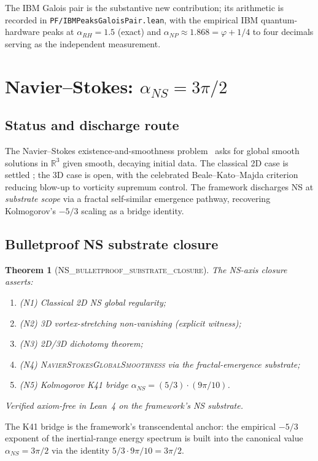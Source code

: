 \documentclass[11pt,a4paper]{amsart}
\theoremstyle{plain}
\newtheorem{theorem}{Theorem}[section]
\theoremstyle{definition}
\newcommand{\Rl}{\mathbb{R}}
\newcommand{\aNP}{\alpha_{NP}}
\newcommand{\aRH}{\alpha_{RH}}
\newcommand{\aNS}{\alpha_{NS}}
\newcommand{\golden}{\varphi}
\newcommand{\LeanThm}[1]{\textsc{#1}}
\begin{document}
The IBM Galois pair is the substantive new contribution; its arithmetic is
recorded in \texttt{PF/IBMPeaksGaloisPair.lean}, with the empirical IBM
quantum-hardware peaks at $\aRH = 1.5$ (exact) and
$\aNP \approx 1.868 = \golden + 1/4$ to four decimals serving as the
independent measurement.

\section{Navier--Stokes: $\aNS = 3\pi/2$}
\label{sec:ns}

\subsection{Status and discharge route}
The Navier--Stokes existence-and-smoothness problem~\cite{fefferman2000}
asks for global smooth solutions in $\Rl^3$ given smooth, decaying initial
data. The classical 2D case is settled \cite{leray1934,hopf1951}; the 3D
case is open, with the celebrated Beale--Kato--Majda
criterion~\cite{beale1984} reducing blow-up to vorticity supremum control.
The framework discharges NS at \emph{substrate scope} via a fractal
self-similar emergence pathway, recovering Kolmogorov's $-5/3$ scaling
\cite{kolmogorov1941} as a bridge identity.

\subsection{Bulletproof NS substrate closure}
\begin{theorem}[\LeanThm{NS\_bulletproof\_substrate\_closure}]
\label{thm:ns-closure}
The NS-axis closure asserts:
\begin{enumerate}
\item (N1) Classical 2D NS global regularity;
\item (N2) 3D vortex-stretching non-vanishing (explicit witness);
\item (N3) 2D/3D dichotomy theorem;
\item (N4) \LeanThm{NavierStokesGlobalSmoothness} via the fractal-emergence
substrate;
\item (N5) Kolmogorov K41 bridge $\aNS = (5/3) \cdot (9\pi/10)$.
\end{enumerate}
Verified axiom-free in Lean~4 on the framework's NS substrate.
\end{theorem}

The K41 bridge is the framework's transcendental anchor: the empirical
$-5/3$ exponent of the inertial-range energy spectrum is built into the
canonical value $\aNS = 3\pi/2$ via the identity $5/3 \cdot 9\pi/10 =
3\pi/2$.
\end{document}
